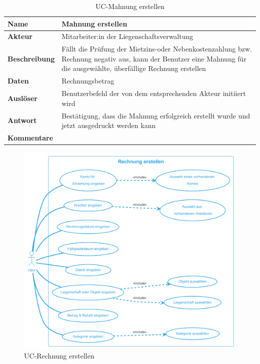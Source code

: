 \vspace*{-0.8cm}
\begin{table}[H]
  \centering
  \settowidth{}
  \setlength\extrarowheight{2pt}
  \begin{tabulary}{1.0\textwidth}{|a|m{14cm}|}
    \hline
    \textbf{Name}& Mahnung erstellen\\
    \hline
    \textbf{Akteur}& Mitarbeiter:in der Liegenschaftsverwaltung\\
    \hline 
    \textbf{Beschreibung} & Fällt die Prüfung der Mietzins-oder Nebenkostenzahlung bzw. Rechnung negativ aus, kann der Benutzer eine Mahnung für die ausgewählte, überfällige Rechnung erstellen \\
    \hline
    \textbf{Daten} & Rechnungsbetrag\\
    \hline
    \textbf{Auslöser} & Benutzerbefehl der von dem entsprechenden Akteur initiiert wird\\
    \hline
    \textbf{Antwort} & Bestätigung, dass die Mahnung erfolgreich erstellt wurde und jetzt ausgedruckt werden kann\\
    \hline
    \textbf{Kommentare} & \\
    \hline
  \end{tabulary}
  \caption{UC-Mahnung erstellen}
\end{table}

\begin{figure}[H]
  \begin{center}
    \includegraphics[width=0.85\linewidth]{content/diagrams/out/usecase/rechnungErstellen/Rechnung erstellen.png}
    \caption{UC-Rechnung erstellen}
  \end{center}
\end{figure}

